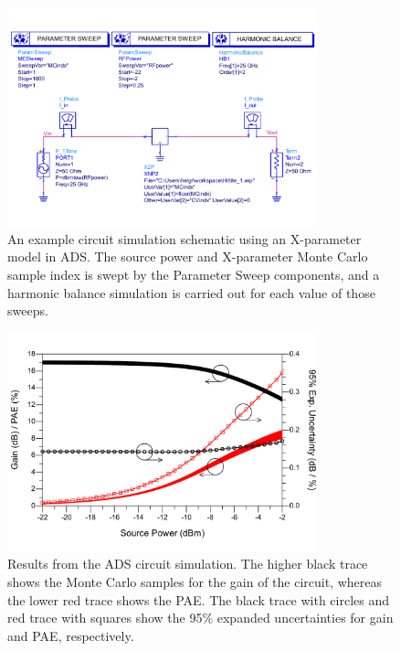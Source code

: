 \documentclass[../thesis/thesis.tex]{subfiles}
\begin{document}
\begin{refsection}
\begin{figure}
	\centering
	\includegraphics[width=0.8\textwidth]{fig6}
	\caption[An example circuit simulation schematic using an X-parameter model incorporating uncertainties in ADS.]{An example circuit simulation schematic using an X-parameter model in ADS. The source power and X-parameter Monte Carlo sample index is swept by the Parameter Sweep components, and a harmonic balance simulation is carried out for each value of those sweeps.}
	\label{ch5_fig_schematic}
\end{figure}

\begin{figure}
	\centering
	\includegraphics[width=0.8\textwidth]{fig7}
	\caption[Results from an ADS circuit simulation using an X-parameter model incorporating uncertainties in ADS.]{Results from the ADS circuit simulation. The higher black trace shows the Monte Carlo samples for the gain of the circuit, whereas the lower red trace shows the PAE. The black trace with circles and red trace with squares show the 95\% expanded uncertainties for gain and PAE, respectively.}
	\label{ch5_fig_adsplot}
\end{figure}


\end{refsection}
\end{document}
